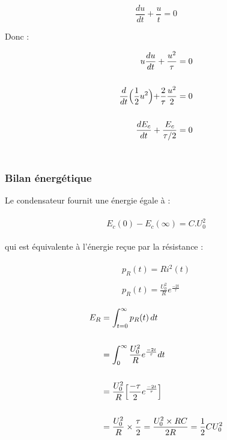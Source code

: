 \documentclass{article}
\begin{document}
$$\frac{du}{dt}+\frac{u}{t}=0$$

Donc :

\begin{align*}\begin{split}
u\frac{du}{dt}+\frac{u^2}{\tau}&=0\\\\
\frac{d}{dt}\Bigl(\frac{1}{2}u^2\Bigl)+\frac{2}{\tau}\frac{u^2}{2}&=0\\\\
\frac{dE_c}{dt}+\frac{E_c}{\tau/2}&=0
\end{split}\end{align*}

\begin{align*}\begin{split}
\end{split}\end{align*}

\subsubsection{Bilan énergétique}

Le condensateur fournit une énergie égale à :

\begin{align*}\begin{split}
E_c(0)-E_c(\infty)=C.U_0^2
\end{split}\end{align*}

qui est équivalente à l'énergie reçue par la résistance :

\begin{align*}\begin{split}
p_R(t)=Ri^2(t)\\\\
p_R(t)=\frac{U_0^2}{R}e^{\frac{-2t}{\tau}}
\end{split}\end{align*}

\begin{align*}\begin{split}
E_R &= \int_{t=0}^{\infty}p_R(t)\,dt\\\\
&= \int_{0}^{\infty}\frac{U_0^2}{R}e^{\frac{-2t}{\tau}}dt\\\\
&= \frac{U_0^2}{R}\Bigl[\frac{-\tau}{2}e^{\frac{-2t}{\tau}}\Bigl]\\\\
&= \frac{U_0^2}{R}\times\frac{\tau}{2}=\frac{U_0^2\times RC}{2R}=\frac{1}{2}CU_0^2
\end{split}\end{align*}
\end{document}
